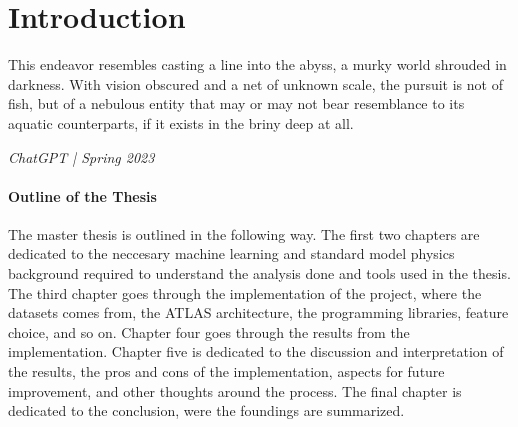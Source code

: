 \chapter*{Introduction}

\epigraph{
    This endeavor resembles casting a line into the abyss, a murky world 
shrouded in darkness. With vision obscured and a net of unknown scale, 
the pursuit is not of fish, but of a nebulous entity that may or may 
not bear resemblance to its aquatic counterparts, if it exists in 
the briny deep at all.}{\textit{ChatGPT | Spring 2023}}


\subsubsection*{Outline of the Thesis}
The master thesis is outlined in the following way. The first two chapters are dedicated to the neccesary machine learning and
standard model physics background required to understand the analysis done and tools used in the thesis. The third chapter goes 
through the implementation of the project, where the datasets comes from, the ATLAS architecture, the programming libraries, 
feature choice, and so on. Chapter four goes through the results from the implementation. Chapter five is dedicated to the discussion and 
interpretation of the results, the pros and cons of the implementation, aspects for future improvement, and other thoughts around the process.
The final chapter is dedicated to the conclusion, were the foundings are summarized. 


